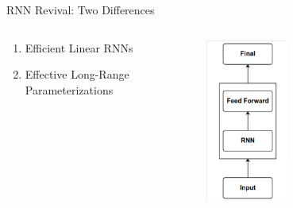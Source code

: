 \begin{frame}{RNN Revival: Two Differences}
\begin{columns}
    \begin{column}{0.5\textwidth}
        
    \begin{enumerate}
        \item Efficient Linear RNNs
        \item Effective Long-Range Parameterizations
    \end{enumerate}

    

    
    \end{column}
    \begin{column}{0.5\textwidth}
\centering
\includegraphics[width=0.4\textwidth, clip,trim={0.1cm 0.1cm 0.1cm 0.1cm}]{Figs/out-rnn.png}
    \end{column}

\end{columns}
\end{frame}



